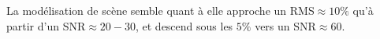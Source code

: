 \documentclass[../main/main.tex]{subfiles}
\begin{document}
La modélisation de scène semble quant à elle
approche un RMS$\approx10\%$ qu'à partir d'un SNR$\approx20-30$, et
descend sous les $5\%$ vers un SNR$\approx60$. 

\begin{figure}[ht]
  \centering
  \caption[]{}
  \label{fig:simu_rms_snr_spectrophoto}
\end{figure}

\begin{figure}[ht]
  \centering
  \caption[]{}
  \label{fig:simu_rms_dist_spectrophoto}
\end{figure}
\end{document}
